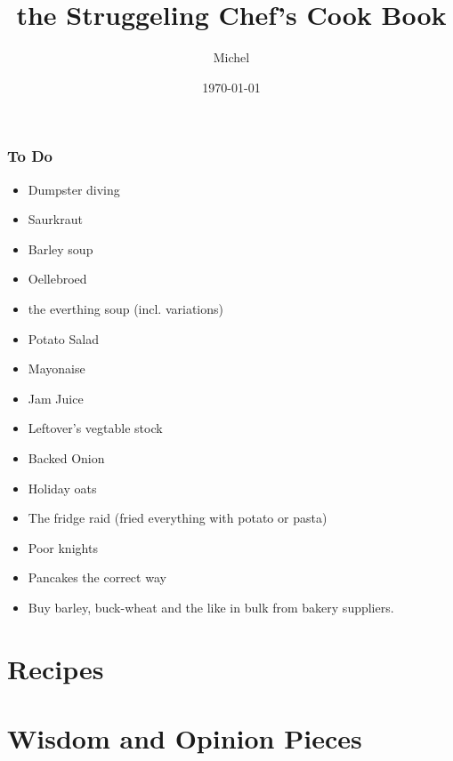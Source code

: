 \documentclass[10pt]{article}
\title{\sc the Struggeling Chef's Cook Book}
\author{Michel}
\date{\today}
\begin{document}
\maketitle

\tableofcontents

\section*{To Do}{
  \begin{itemize}
    \item Dumpster diving
    \item Saurkraut
    \item Barley soup
    \item Oellebroed
    \item the everthing soup (incl. variations)
    \item Potato Salad
    \item Mayonaise
    \item Jam Juice
    \item Leftover's vegtable stock
    \item Backed Onion
    \item Holiday oats
    \item The fridge raid (fried everything with potato or pasta)
    \item Poor knights
    \item Pancakes the correct way
    \item Buy barley, buck-wheat and the like in bulk from bakery suppliers.
  \end{itemize}

}

\clearpage
\part{\sc Recipes}
\begingroup
\let\clearpage\relax
\let\newpage\relax
\begin{multicols}{2}


\end{multicols}
\endgroup

\clearpage
{}
\part{\sc Wisdom and Opinion Pieces}

\end{document}
